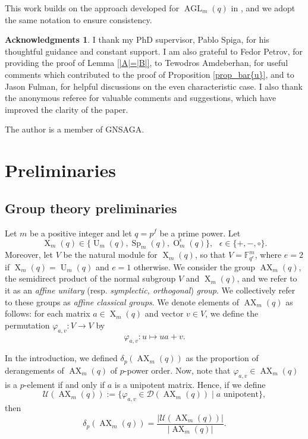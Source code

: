 \documentclass[a4paper, 12pt, oneside]{amsart}
\theoremstyle{definition}
\newtheorem*{ackn}{Acknowledgments}
\DeclareMathOperator{\AGL}{AGL}
\DeclareMathOperator{\AX}{AX}
\DeclareMathOperator{\U}{U}
\DeclareMathOperator{\Sp}{Sp}
\DeclareMathOperator{\Or}{O}
\DeclareMathOperator{\X}{X}
\begin{document}
This work builds on the approach developed for $\AGL_m(q)$ in \cite{SpigaAGL}, and we adopt the same notation to ensure consistency.

\begin{ackn}
I thank my PhD supervisor, Pablo Spiga, for his thoughtful guidance and constant support. I am also grateful to Fedor Petrov, for providing the proof of Lemma \ref{|A|=|B|}, to Tewodros Amdeberhan, for useful comments which contributed to the proof of Proposition \ref{prop_bar{u}}, and to Jason Fulman, for helpful discussions on the even characteristic case. I also thank the anonymous referee for valuable comments and suggestions, which have improved the clarity of the paper.

The author is a member of GNSAGA.
\end{ackn}
\section{Preliminaries}
\label{preliminaries}
\subsection*{Group theory preliminaries} 

Let $m$ be a positive integer and let $q=p^f$ be a prime power. Let $$\X_m(q) \in \{\U_m(q), \Sp_{m}(q), \Or^{\epsilon}_m(q)\}, \text{ }\epsilon \in \{+,-,\circ\}.$$ Moreover, let $V$ be the natural module for $\X_m(q)$, so that $V=\mathbb{F}_{q^e}^{m}$, where $e=2$ if $\X_m(q)=\U_m(q)$ and $e=1$ otherwise.
We consider the group $\AX_m(q)$, the semidirect product of the normal subgroup $V$ and $\X_m(q)$, and we refer to it as an \textit{affine unitary} (resp. \textit{symplectic, orthogonal}) \textit{group}. We collectively refer to these groups as \textit{affine classical groups}.
We denote elements of $\AX_m(q)$ as follows: for each matrix $a \in \X_m(q)$ and vector $v \in V$, we define the permutation $\varphi_{a,v}: V \rightarrow V$ by
$$\varphi_{a,v}: u \mapsto ua+v.$$

In the introduction, we defined $\delta_p(\AX_m(q))$ as the proportion of derangements of $\AX_m(q)$ of $p$-power order. Now, note that $\varphi_{a,v} \in \AX_m(q)$ is a $p$-element if and only if $a$ is a unipotent matrix. Hence, if we define
   $$ \mathcal{U}(\AX_m(q)) := \{\varphi_{a,v} \in \mathcal{D}(\AX_m(q)) \mid a \text{ unipotent}\},$$
then
\begin{equation}
\label{unip}
    \delta_p(\AX_m(q))= \frac{|\mathcal{U}(\AX_m(q))|}{|\AX_m(q)|}.
\end{equation}
\end{document}
